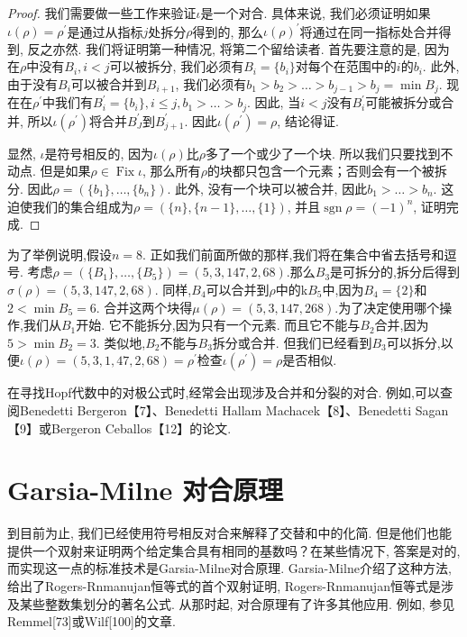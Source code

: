 \documentclass{ctexbook}
\begin{document}
\begin{proof}
	我们需要做一些工作来验证$\iota$是一个对合. 具体来说, 我们必须证明如果$\iota(\rho)=\rho^{'}$是通过从指标$j$处拆分$\rho$得到的, 那么$\iota(\rho)^{'}$将通过在同一指标处合并得到, 反之亦然. 我们将证明第一种情况, 将第二个留给读者. 首先要注意的是, 因为在$\rho$中没有$B_{i},i<j$可以被拆分, 我们必须有$B_{i}=\{b_{i}\}$对每个在范围中的$i$的$b_{i}$. 此外, 由于没有$B_{i}$可以被合并到$B_{i+1}$, 我们必须有$b_{1}>b_{2}>\ldots>b_{j-1}>b_{j}=\operatorname{min}B_{j}$. 现在在$\rho^{'}$中我们有$B_{i}^{'}=\{b_{i}\},i\leq j,b_{1}>\ldots>b_{j}$. 因此, 当$i<j$没有$B_{i}^{'}$可能被拆分或合并, 所以$\iota(\rho^{'})$将合并$B_{J}^{'}$到$B_{j+1}^{'}$. 因此$\iota(\rho^{'})=\rho$, 结论得证.
	
	显然, $\iota$是符号相反的, 因为$\iota(\rho)$比$\rho$多了一个或少了一个块. 所以我们只要找到不动点. 但是如果$\rho\in \operatorname{Fix}\iota$, 那么所有$\rho$的块都只包含一个元素；否则会有一个被拆分. 因此$\rho=(\{b_{1}\},\ldots,\{b_{n}\})$. 此外, 没有一个块可以被合并, 因此$b_{1}>\ldots >b_{n}$. 这迫使我们的集合组成为$\rho=(\{n\},\{n-1\},
	\ldots,\{1\})$, 并且$\operatorname{sgn}\rho=(-1)^{n}$, 证明完成. 
\end{proof}

为了举例说明,假设$n=8$. 正如我们前面所做的那样,我们将在集合中省去括号和逗号. 考虑$\rho=(\{B_{1}\},\ldots,\{B_{5}\})=(5,3,147,2,68)$.那么$B_{3}$是可拆分的,拆分后得到$\sigma(\rho)=(5,3,147,2,68)$. 同样,$B_{4}$可以合并到$\rho$中的k$B_{5}$中,因为$B_{4}=\{2\}$和$2<\min B_{5}=6$. 合并这两个块得$\mu(\rho)=(5,3,147,268)$.为了决定使用哪个操作,我们从$B_{1}$开始. 它不能拆分,因为只有一个元素. 而且它不能与$B_{2}$合并,因为$5>\min B_{2}=3$. 
类似地,$B_{2}$不能与$B_{3}$拆分或合并. 但我们已经看到$B_{3}$可以拆分,以便$\iota(\rho)=(5,3,1,47,2,68)=\rho^{'}$检查$\iota(\rho^{'})=\rho$是否相似. 

在寻找Hopf代数中的对极公式时,经常会出现涉及合并和分裂的对合. 例如,可以查阅Benedetti Bergeron【7】、Benedetti Hallam Machacek【8】、Benedetti Sagan【9】或Bergeron Ceballos【12】的论文. 
\section{Garsia-Milne 对合原理}
	到目前为止, 我们已经使用符号相反对合来解释了交替和中的化简. 但是他们也能提供一个双射来证明两个给定集合具有相同的基数吗？在某些情况下, 答案是对的, 而实现这一点的标准技术是Garsia-Milne对合原理. Garsia-Milne介绍了这种方法, 给出了Rogers-Rnmanujan恒等式的首个双射证明, Rogers-Rnmanujan恒等式是涉及某些整数集划分的著名公式. 从那时起, 对合原理有了许多其他应用. 例如, 参见Remmel[73]或Wilf[100]的文章.
\end{document}
